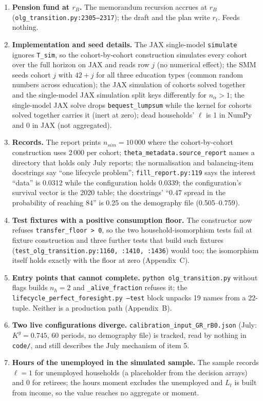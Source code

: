 \documentclass[11pt,a4paper]{article}
\newcommand{\code}[1]{\texttt{#1}}
\begin{document}
\begin{enumerate}[label=m\arabic*.]
\item \textbf{Pension fund at $r_B$.} The memorandum recursion accrues at $r_B$ (\code{olg_transition.py:2305--2317}); the draft and the plan write $r_t$. Feeds nothing.
\item \textbf{Implementation and seed details.} The JAX single-model \code{simulate} ignores \code{T_sim}, so the cohort-by-cohort construction simulates every cohort over the full horizon on JAX and reads row $j$ (no numerical effect); the SMM seeds cohort $j$ with $42 + j$ for all three education types (common random numbers across education); the JAX simulation of cohorts solved together and the single-model JAX simulation split keys differently for $n_\alpha > 1$; the single-model JAX solve drops \code{bequest_lumpsum} while the kernel for cohorts solved together carries it (inert at zero); dead households' $\ell$ is 1 in NumPy and 0 in JAX (not aggregated).
\item \textbf{Records.} The report prints $n_{sim} = 10\,000$ where the cohort-by-cohort construction uses 2\,000 per cohort; \code{theta_metadata.source_report} names a directory that holds only July reports; the normalisation and balancing-item docstrings say ``one lifecycle problem''; \code{fill_report.py:119} says the interest ``data'' is 0.0312 while the configuration holds 0.0339; the configuration's survival vector is the 2020 table; the docstrings' ``0.47 spread in the probability of reaching 84'' is 0.25 on the demography file (0.505--0.759).
\item \textbf{Test fixtures with a positive consumption floor.} The constructor now refuses \code{transfer_floor > 0}, so the two household-isomorphism tests fail at fixture construction and three further tests that build such fixtures (\code{test_olg_transition.py:1160, :1410, :1436}) would too; the isomorphism itself holds exactly with the floor at zero (Appendix~C).
\item \textbf{Entry points that cannot complete.} \code{python olg_transition.py} without flags builds $n_h = 2$ and \code{_alive_fraction} refuses it; the \code{lifecycle_perfect_foresight.py --test} block unpacks 19 names from a 22-tuple. Neither is a production path (Appendix~B).
\item \textbf{Two live configurations diverge.} \code{calibration_input_GR_rB0.json} (July: $K^g = 0.745$, 60 periods, no demography file) is tracked, read by nothing in \code{code/}, and still describes the July mechanism of item 5.
\item \textbf{Hours of the unemployed in the simulated sample.} The sample records $\ell = 1$ for unemployed households (a placeholder from the decision arrays) and $0$ for retirees; the hours moment excludes the unemployed and $L_t$ is built from income, so the value reaches no aggregate or moment.
\end{enumerate}
\end{document}
